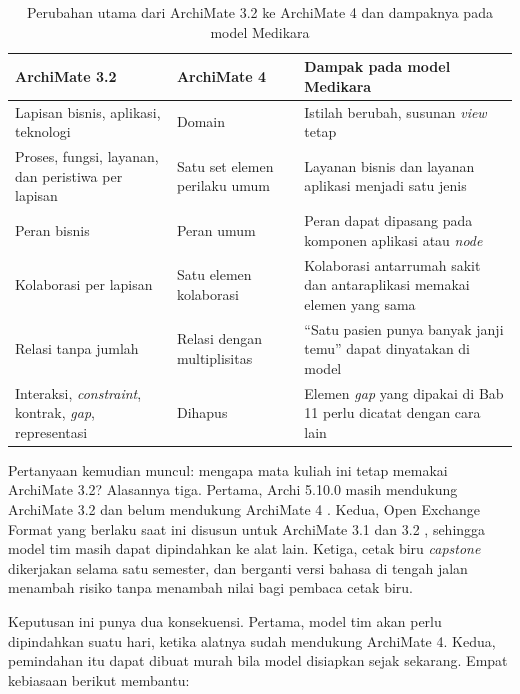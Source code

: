 \begin{table}[!htb]
  \centering
  \caption{Perubahan utama dari ArchiMate 3.2 ke ArchiMate 4 dan dampaknya
           pada model Medikara}
  \label{tab:ch04-archimate4}
  \small
  \begin{tabularx}{\textwidth}{>{\raggedright\arraybackslash}p{3.0cm}>{\raggedright\arraybackslash}p{3.6cm}X}
    \hline
    \textbf{ArchiMate 3.2} & \textbf{ArchiMate 4} & \textbf{Dampak pada model Medikara} \\
    \hline
    Lapisan bisnis, aplikasi, teknologi & Domain & Istilah berubah, susunan \textit{view} tetap \\
    \hline
    Proses, fungsi, layanan, dan peristiwa per lapisan & Satu set elemen perilaku umum & Layanan bisnis dan layanan aplikasi menjadi satu jenis \\
    \hline
    Peran bisnis & Peran umum & Peran dapat dipasang pada komponen aplikasi atau \textit{node} \\
    \hline
    Kolaborasi per lapisan & Satu elemen kolaborasi & Kolaborasi antarrumah sakit dan antaraplikasi memakai elemen yang sama \\
    \hline
    Relasi tanpa jumlah & Relasi dengan multiplisitas & ``Satu pasien punya banyak janji temu'' dapat dinyatakan di model \\
    \hline
    Interaksi, \textit{constraint}, kontrak, \textit{gap}, representasi & Dihapus & Elemen \textit{gap} yang dipakai di Bab 11 perlu dicatat dengan cara lain \\
    \hline
  \end{tabularx}
\end{table}

Pertanyaan kemudian muncul: mengapa mata kuliah ini tetap memakai ArchiMate
3.2? Alasannya tiga. Pertama, Archi 5.10.0 masih mendukung ArchiMate 3.2 dan
belum mendukung ArchiMate 4 \cite{archi}. Kedua, Open Exchange Format yang
berlaku saat ini disusun untuk ArchiMate 3.1 dan 3.2 \cite{c04-exchange},
sehingga model tim masih dapat dipindahkan ke alat lain. Ketiga, cetak biru
\textit{capstone} dikerjakan selama satu semester, dan berganti versi bahasa di
tengah jalan menambah risiko tanpa menambah nilai bagi pembaca cetak biru.

Keputusan ini punya dua konsekuensi. Pertama, model tim akan perlu
dipindahkan suatu hari, ketika alatnya sudah mendukung ArchiMate 4. Kedua,
pemindahan itu dapat dibuat murah bila model disiapkan sejak sekarang. Empat
kebiasaan berikut membantu:

